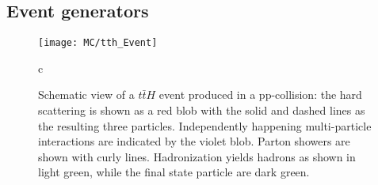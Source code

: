 \subsection{Event generators}

\begin{figure}[h]
\begin{center}
\texttt{[image: MC/tth\_Event]}
\end{center}
\caption{Schematic view of a $t\bar{t}H$ event produced in a pp-collision: the hard scattering is shown as a red blob with the solid and dashed lines as the resulting three particles.
Independently happening multi-particle interactions are indicated by the violet blob. 
Parton showers are shown with curly lines.
Hadronization yields hadrons as shown in light green, while the final state particle are dark green.
}
c
\end{figure}

